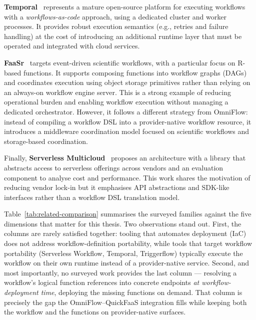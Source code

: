 \textbf{Temporal}~\cite{temporalPlatform} represents a mature open-source platform for executing workflows with a \textit{workflows-as-code} approach, using a dedicated cluster and worker processes. It provides robust execution semantics (e.g., retries and failure handling) at the cost of introducing an additional runtime layer that must be operated and integrated with cloud services.

\textbf{FaaSr}~\cite{park2024faasr} targets event-driven scientific workflows, with a particular focus on R-based functions. It supports composing functions into workflow graphs (DAGs) and coordinates execution using object storage primitives rather than relying on an always-on workflow engine server. This is a strong example of reducing operational burden and enabling workflow execution without managing a dedicated orchestrator. However, it follows a different strategy from OmniFlow: instead of compiling a workflow DSL into a provider-native workflow resource, it introduces a middleware coordination model focused on scientific workflows and storage-based coordination.

Finally, \textbf{Serverless Multicloud}~\cite{zhao2022supporting} proposes an architecture with a library that abstracts access to serverless offerings across vendors and an evaluation component to analyse cost and performance. This work shares the motivation of reducing vendor lock-in but it emphasises API abstractions and SDK-like interfaces rather than a workflow DSL translation model.

Table~\ref{tab:related-comparison} summarises the surveyed families against the five dimensions
that matter for this thesis. Two observations stand out. First, the columns are rarely satisfied
together: tooling that automates deployment (IaC) does not address workflow-definition portability,
while tools that target workflow portability (Serverless Workflow, Temporal, Triggerflow) typically
execute the workflow on their own runtime instead of a provider-native service. Second, and most
importantly, no surveyed work provides the last column --- resolving a workflow's logical function
references into concrete endpoints \emph{at workflow-deployment time}, deploying the missing
functions on demand. That column is precisely the gap the OmniFlow--QuickFaaS integration fills
while keeping both the workflow and the functions on provider-native surfaces.

